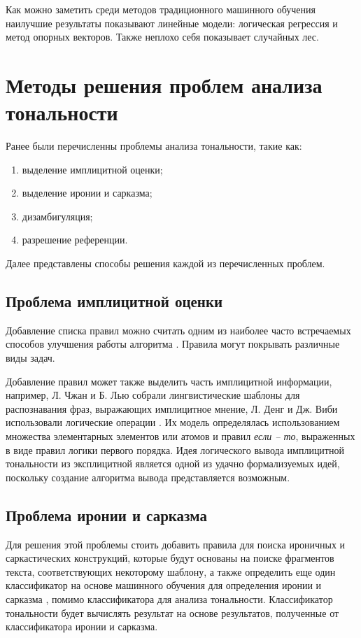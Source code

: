 \documentclass[a4paper,14pt, unknownkeysallowed]{extreport}
\begin{document}
	Как можно заметить среди методов традиционного машинного обучения наилучшие результаты показывают линейные модели: логическая регрессия и метод опорных векторов. Также неплохо себя показывает случайных лес. 

\section{Методы решения проблем анализа тональности}

Ранее были перечисленны проблемы анализа тональности, такие как:

\begin{enumerate}
	\item выделение имплицитной оценки;
	\item выделение иронии и сарказма;
	\item дизамбигуляция;
	\item разрешение референции.
\end{enumerate}

Далее представлены способы решения каждой из перечисленных проблем.

\subsection{Проблема имплицитной оценки}

Добавление списка правил можно считать одним из наиболее часто встречаемых способов улучшения работы алгоритма \cite{Semina2}. Правила могут покрывать различные виды задач.

Добавление правил может также выделить часть имплицитной информации, например, Л. Чжан и Б. Лью собрали лингвистические шаблоны для распознавания фраз, выражающих имплицитное мнение, Л. Денг и Дж. Виби использовали логические операции \cite{Semina2}. Их модель определялась использованием множества элементарных элементов или атомов и правил \textit{если -- то}, выраженных в виде правил логики первого порядка. Идея логического вывода имплицитной тональности из эксплицитной является одной из удачно формализуемых идей, поскольку создание алгоритма вывода представляется возможным.

\subsection{Проблема иронии и сарказма}

Для решения этой проблемы стоить добавить правила для поиска ироничных и саркастических конструкций, которые будут основаны на поиске фрагментов текста, соответствующих некоторому шаблону, а также определить еще один классификатор на основе машинного обучения для определения иронии и сарказма \cite{Semina2, Volkova}, помимо классификатора для анализа тональности. Классификатор тональности будет вычислять результат на основе результатов, полученные от классификатора иронии и сарказма.
\end{document}
